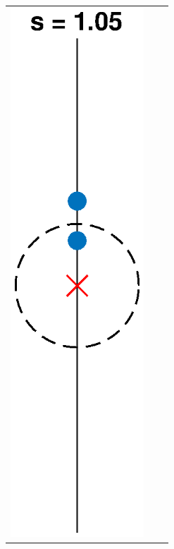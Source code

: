 \documentclass[thesis.tex]{subfiles}
\begin{document}
\begin{figure}[H]
\begin{center}
\begin{tabular}{ccc}
\includegraphics[width=5cm]{images/kreinbubbles/bubble105R} &

\end{tabular}
\end{center}
\end{figure}
\end{document}
